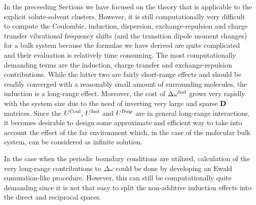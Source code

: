 \documentclass[a4paper,titlepage,twoside,fleqn,12pt]{book}
\begin{document}
\begin{refsection}
In the preceeding Sections we have focused on the
theory that is applicable to the explicit solute\hyp{}solvent
clusters. However, it is still computationally very difficult 
to compute the Coulombic, induction, dispersion, exchange\hyp{}repulsion
and charge transfer vibrational frequency shifts (and the transition dipole moment changes)
for a bulk system because the formulae we have derived are quite
complicated and their evaluation is relatively time consuming. The most computationally
demanding terms are the induction, charge transfer and exchange\hyp{}repulsion contributions.
While the latter two are fairly short\hyp{}range effects
and should be readily converged with a reasonably small amount of
surrounding molecules, the induction is a long\hyp{}range effect. Moreover,
the cost of $\Delta\omega^{\rm Ind}$ grows very rapidly with the system size
due to the need of inverting very large and sparse $\bf D$ matrices.
Since the $U^{\rm Coul}$, $U^{\rm Ind}$ and $U^{\rm Disp}$
are in general long\hyp{}range interactions, it becomes desirable
to design some approximate and efficient way to take into account the
effect of the far environment which, in the case of the molecular bulk 
system, can be considered as infinite solution.

In the case when the periodic boundary conditions are utilized, 
calculation of the very long\hyp{}range contributions to $\Delta\omega$ 
could be done by developing an Ewald summation\hyp{}like procedure.
However, this can still be computationally quite demanding since it is
not that easy to split the non\hyp{}additive induction effects
into the direct and reciprocal spaces.


\end{refsection}
\end{document}
